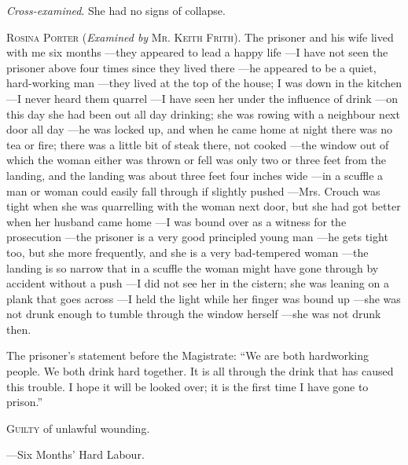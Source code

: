 {    \textit{Cross-examined}. She had no signs of collapse.

    \textsc{Rosina Porter} (\textit{Examined by} \textsc{Mr. Keith Frith}). The prisoner and his wife lived with me six months
    ---they appeared to lead a happy life
    ---I have not seen the prisoner above four times since they lived there
    ---he appeared to be a quiet, hard-working man
    ---they lived at the top of the house; I was down in the kitchen
    ---I never heard them quarrel
    ---I have seen her under the influence of drink
    ---on this day she had been out all day drinking; she was rowing with a neighbour next door all day
    ---he was locked up, and when he came home at night there was no tea or fire; there was a little bit of steak there, not cooked
    ---the window out of which the woman either was thrown or fell was only two or three feet from the landing, and the landing was about three feet four inches wide
    ---in a scuffle a man or woman could easily fall through if slightly pushed
    ---Mrs. Crouch was tight when she was quarrelling with the woman next door, but she had got better when her husband came home
    ---I was bound over as a witness for the prosecution
    ---the prisoner is a very good principled young man
    ---he gets tight too, but she more frequently, and she is a very bad-tempered woman
    ---the landing is so narrow that in a scuffle the woman might have gone through by accident without a push
    ---I did not see her in the cistern; she was leaning on a plank that goes across
    ---I held the light while her finger was bound up
    ---she was not drunk enough to tumble through the window herself
    ---she was not drunk then.

    The prisoner's statement before the Magistrate: ``We are both hardworking people. We both drink hard together. It is all through the drink that has caused this trouble. I hope it will be looked over; it is the first time I have gone to prison.''

    \textsc{Guilty} of unlawful wounding.

    ---Six Months' Hard Labour.
}
\restoregeometry
